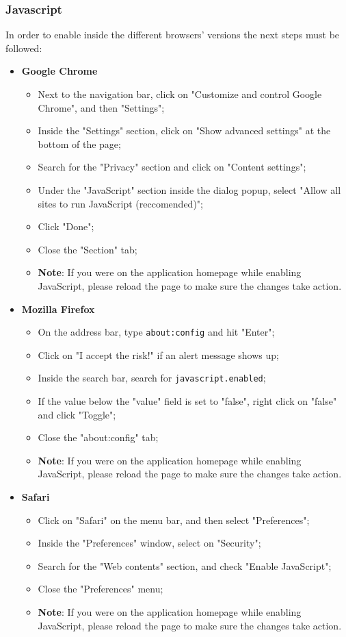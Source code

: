 \subsubsection{Javascript}
In order to enable  inside the different browsers' versions the next steps must be followed:
\begin{itemize}
	\item \textbf{Google Chrome}
		\begin{itemize}
			\item Next to the navigation bar, click on "Customize and control Google Chrome", and then "Settings";
			\item Inside the "Settings" section, click on "Show advanced settings" at the bottom of the page;
			\item Search for the "Privacy" section and click on "Content settings";
			\item Under the "JavaScript" section inside the dialog popup, select "Allow all sites to run JavaScript (reccomended)";
			\item Click "Done";
			\item Close the "Section" tab;
			\item \textbf{Note}: If you were on the application homepage while enabling JavaScript, please reload the page to make sure the changes take action.
		\end{itemize}
		
	\item \textbf{Mozilla Firefox}
		\begin{itemize}
			\item On the address bar, type \texttt{about:config} and hit "Enter";
			\item Click on "I accept the risk!" if an alert message shows up;
			\item Inside the search bar, search for \texttt{javascript.enabled};
			\item If the value below the "value" field is set to "false", right click on "false" and click "Toggle";
			\item Close the "about:config" tab;
			\item \textbf{Note}: If you were on the application homepage while enabling JavaScript, please reload the page to make sure the changes take action.
		\end{itemize}
		
	\item \textbf{Safari}
		\begin{itemize}
			\item Click on "Safari" on the menu bar, and then select "Preferences";
			\item Inside the "Preferences" window, select on "Security";
			\item Search for the "Web contents" section, and check "Enable JavaScript"; 
			\item Close the "Preferences" menu;
			\item \textbf{Note}: If you were on the application homepage while enabling JavaScript, please reload the page to make sure the changes take action.
		\end{itemize}
\end{itemize}


